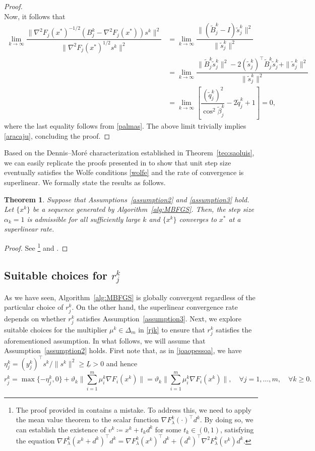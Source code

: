 \documentclass[11pt]{article}
\newtheorem{theorem}{Theorem}[section]
\numberwithin{assumption}{section}
\newcommand{\xs}{x^{\ast}}
\newcommand{\ts}{\tilde{s}_j^k}
\newcommand{\tq}{\tilde{q}_j^k}
\newcommand{\tB}{\tilde{B}_j^k}
\begin{document}
\begin{proof}
\begin{equation}
   \end{equation}
Now, it follows that
\begin{align*}
\lim_{k\to\infty}\dfrac{\|\nabla^2F_j(x^{*})^{-1/2}(B_j^k - \nabla^2F_j(x^{*}))s^k\|^2}{\|\nabla^2F_j(x^{*})^{1/2}s^k\|^2} 
& = \lim_{k\to\infty} \dfrac{\|(\tB - I)\ts\|^2}{\|\ts\|^2} \\
& = \lim_{k\to\infty}\dfrac{\|\tB\ts\|^2 - 2(\ts)^\top\tB\ts + \|\ts\|^2}{\|\ts\|^2} \\
& = \lim_{k\to\infty}\left[\dfrac{(\tq)^2}{\cos^2\tilde{\beta}_j^k} - 2\tq + 1 \right] =0,
\end{align*} 
where the last equality follows from \eqref{palmas}.
The above limit trivially implies \eqref{aracaju}, concluding the proof.
\end{proof}

Based on the Dennis--Mor\'e characterization established in Theorem~\ref{teo:saoluis}, we can easily replicate the proofs presented in \cite{Leandro&Danilo} to show that unit step size eventually satisfies the Wolfe conditions \eqref{wolfe} and the rate of convergence is superlinear. We formally state the results as follows.

\begin{theorem}
Suppose that Assumptions~\ref{assumption2} and \ref{assumption3} hold. Let $\{x^k\}$ be a sequence generated by Algorithm~\ref{alg:MBFGS}. Then, the step size $\alpha_k =1$ is admissible for all sufficiently large $k$ and $\{x^k\}$ converges to $\xs$ at a superlinear rate.
\end{theorem}
\begin{proof}
See \cite[Theorem~5.5]{Leandro&Danilo}\footnote{The proof provided in \cite[Theorem~5.5]{Leandro&Danilo} contains a mistake. To address this, we need to apply the mean value theorem to the scalar function $\nabla F_{\lambda}^k(\cdot)^\top d^k$. By doing so, we can establish the existence of $v^k\coloneqq x^k+t_kd^k$ for some $t_k\in(0,1)$, satisfying the equation $\nabla F_{\lambda}^k(x^k + d^k)^\top d^k =\nabla F_{\lambda}^k(x^k)^\top d^k + (d^k)^\top \nabla^2F_{\lambda}^k(v^k)d^k$.} and \cite[Theorem~5.7]{Leandro&Danilo}.
\end{proof}

\subsection{Suitable choices for $r_j^k$} \label{sec:rjk}

As we have seen, Algorithm~\ref{alg:MBFGS} is globally convergent regardless of the particular choice of $r_j^k$. On the other hand, the superlinear convergence rate depends on whether $r_j^k$ satisfies Assumption~\ref{assumption3}. Next, we explore suitable choices for the multiplier $\mu^k\in\Delta_m$ in \eqref{rjk} to ensure that $r_j^k$ satisfies the aforementioned assumption. 
In what follows, we will assume that Assumption~\ref{assumption2} holds. First note that, as in \eqref{joaopessoa}, we have $\eta_j^k = (y_{j}^k)^\top s^k/\|s^k\|^2\geq \underline{L}>0$ and hence
\[r_j^k =\max \{-\eta_j^k, 0\} + \vartheta_k\|\sum_{i=1}^m\mu_i^k \nabla F_i(x^k)\| =  \vartheta_k\|\sum_{i=1}^m\mu_i^k \nabla F_i(x^k)\|,  \quad \forall j=1,\ldots,m, \quad \forall k\geq 0.\]
\end{document}
